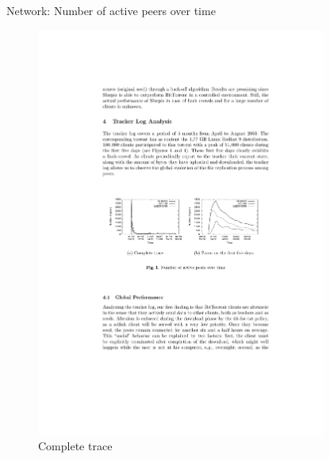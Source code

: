 \begin{frame}{Network: Number of active peers over time}
	
\begin{figure}	
	\includegraphics[width=0.85\textwidth]{figs/10/bt-fig1}
	\caption{Complete trace}
\end{figure}	
	
\end{frame}

